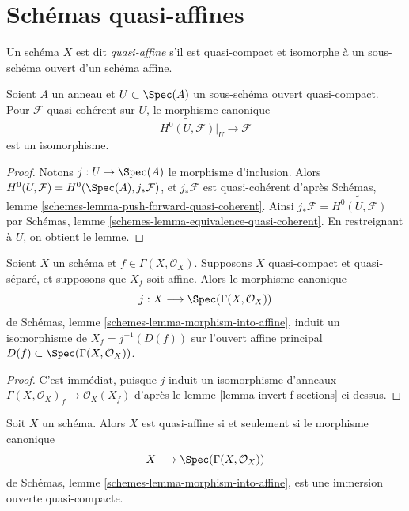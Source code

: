 \section{Schémas quasi-affines}
\label{section-quasi-affine}

\begin{definition}
\label{definition-quasi-affine}
Un schéma $X$ est dit {\it quasi-affine} s'il est quasi-compact
et isomorphe à un sous-schéma ouvert d'un schéma affine.
\end{definition}

\begin{lemma}
\label{lemma-quasi-coherent-quasi-affine}
Soient $A$ un anneau et $U \subset \Spec(A)$ un sous-schéma ouvert
quasi-compact. Pour $\mathcal{F}$ quasi-cohérent sur $U$, le morphisme canonique
$$
\widetilde{H^0(U, \mathcal{F})}|_U \to \mathcal{F}
$$
est un isomorphisme.
\end{lemma}

\begin{proof}
Notons $j : U \to \Spec(A)$ le morphisme d'inclusion. Alors
$H^0(U, \mathcal{F}) = H^0(\Spec(A), j_*\mathcal{F})$, et
$j_*\mathcal{F}$ est quasi-cohérent d'après
Schémas, lemme \ref{schemes-lemma-push-forward-quasi-coherent}.
Ainsi $j_*\mathcal{F} = \widetilde{H^0(U, \mathcal{F})}$ par
Schémas, lemme \ref{schemes-lemma-equivalence-quasi-coherent}.
En restreignant à $U$, on obtient le lemme.
\end{proof}

\begin{lemma}
\label{lemma-invert-f-affine}
Soient $X$ un schéma et $f \in \Gamma(X, \mathcal{O}_X)$.
Supposons $X$ quasi-compact et quasi-séparé, et supposons que
$X_f$ soit affine. Alors le morphisme canonique
$$
j : X \longrightarrow \Spec(\Gamma(X, \mathcal{O}_X))
$$
de Schémas, lemme \ref{schemes-lemma-morphism-into-affine},
induit un isomorphisme de $X_f = j^{-1}(D(f))$ sur l'ouvert affine principal
$D(f) \subset \Spec(\Gamma(X, \mathcal{O}_X))$.
\end{lemma}

\begin{proof}
C'est immédiat, puisque $j$ induit un isomorphisme d'anneaux
$\Gamma(X, \mathcal{O}_X)_f \to \mathcal{O}_X(X_f)$ d'après le
lemme \ref{lemma-invert-f-sections} ci-dessus.
\end{proof}

\begin{lemma}
\label{lemma-quasi-affine}
Soit $X$ un schéma. Alors $X$ est quasi-affine si et seulement si
le morphisme canonique
$$
X \longrightarrow \Spec(\Gamma(X, \mathcal{O}_X))
$$
de Schémas, lemme \ref{schemes-lemma-morphism-into-affine}, est
une immersion ouverte quasi-compacte.
\end{lemma}

